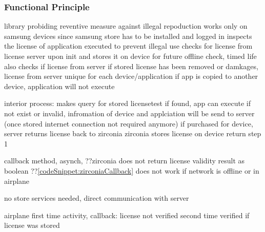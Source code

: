 \subsubsection{Functional Principle} \label{section:license-samsung-functional}

library probiding reventive measure against illegal repoduction
works only on samsung devices since samsung store has to be installed and logged in
inspects the license of application executed to prevent illegal use
checks for license from license server upon init and stores it on device for future offline check, timed life
also checks if license from server if stored license has been removed or damkages, license from server unique for each device/application
if app is copied to another device, application will not execute

interior process:
makes query for stored licensetest
if found, app can execute
if not exist or invalid, infromation of device and applciation will be send to server (once stored internet connection not required anymore)
if purchased for device, server returns license back to zirconia
zirconia stores license on device
return step 1

callback method, asynch, ??zirconia does not return license validity result as boolean ??\ref{codeSnippet:zirconiaCallback}
does not work if network is offline or in airplane

\cite{samsungZirconia}
%



no store services needed, direct communication with server

airplane
first time
activity, callback: license not verified
second time
verified if license was stored
